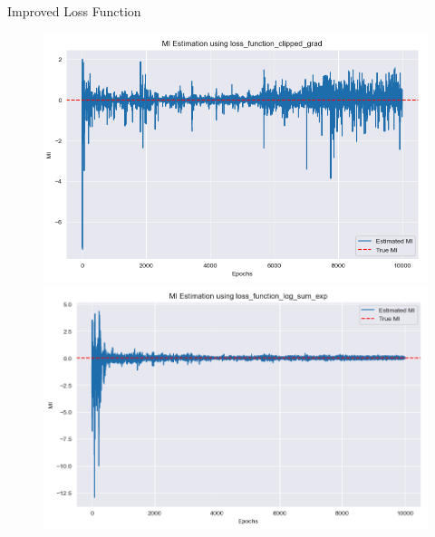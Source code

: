 \documentclass[final]{beamer}
\newlength{\colwidth}
\begin{document}
\begin{frame}[t]
\begin{columns}[t]
\begin{column}{\colwidth}
\begin{block}{Improved Loss Function}
    \begin{figure}
    \centering
    \begin{minipage}{0.49\textwidth}
    \centering
    \includegraphics[width=1\linewidth]{MI_img/截屏2024-12-31 13.19.52.png}
    \end{minipage}
    \begin{minipage}{0.49\textwidth}
    \centering
    \centering
    \includegraphics[width=1\linewidth]{MI_img/截屏2024-12-31 13.20.10.png}
    \end{minipage}
    \end{figure}


\end{block}
\end{column}
\end{columns}
\end{frame}
\end{document}
